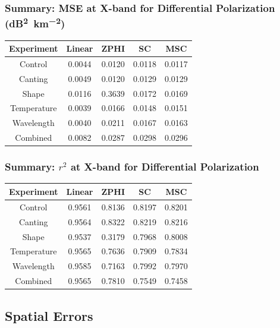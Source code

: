 \documentclass[red]{beamer}
\begin{document}
\begin{frame}
    \frametitle{Summary: MSE at X-band for Differential Polarization (\si{dB\squared\per \kilo\meter\squared})}
    \begin{center}
        \begin{tabular}{| c | c | c | c | c |}
            \hline
            Experiment & Linear & ZPHI & SC & MSC \\
            \hline
            \hline
            Control & 0.0044 & 0.0120 & 0.0118 & 0.0117 \\
            Canting & 0.0049 & 0.0120 & 0.0129 & 0.0129 \\
            Shape & 0.0116 & 0.3639 & 0.0172 & 0.0169 \\
            Temperature & 0.0039 & 0.0166 & 0.0148 & 0.0151 \\
            Wavelength & 0.0040 & 0.0211 & 0.0167 & 0.0163 \\
            Combined & 0.0082 & 0.0287 & 0.0298 & 0.0296 \\
            \hline
        \end{tabular}
    \end{center}
\end{frame}

\begin{frame}
    \frametitle{Summary: $r^2$ at X-band for Differential Polarization}
    \begin{center}
        \begin{tabular}{| c | c | c | c | c |}
            \hline
            Experiment & Linear & ZPHI & SC & MSC \\
            \hline
            \hline
            Control & 0.9561 & 0.8136 & 0.8197 & 0.8201 \\
            Canting & 0.9564 & 0.8322 & 0.8219 & 0.8216 \\
            Shape & 0.9537 & 0.3179 & 0.7968 & 0.8008 \\
            Temperature & 0.9565 & 0.7636 & 0.7909 & 0.7834 \\
            Wavelength & 0.9585 & 0.7163 & 0.7992 & 0.7970 \\
            Combined & 0.9565 & 0.7810 & 0.7549 & 0.7458 \\
            \hline
        \end{tabular}
    \end{center}
\end{frame}

\subsection{Spatial Errors}
\end{document}
